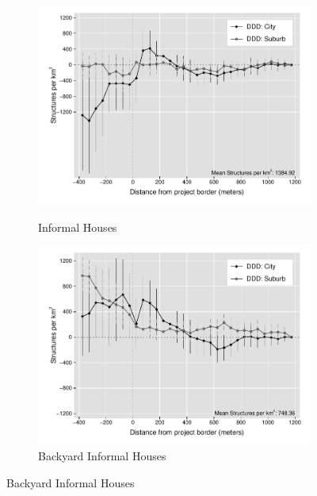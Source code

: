 \documentclass[12pt]{article}
\begin{document}
\begin{figure}[t!]
\begin{subfigure}[b]{0.49\textwidth}
        \label{fig:DDDformal_het}
    \end{subfigure}
    \vskip 1mm \vskip 0pt
    \begin{subfigure}[b]{0.49\textwidth}
        \centering
        \caption[]{\small Informal Houses}
        \vspace{-1mm}
        \includegraphics[width=\textwidth,trim={.5cm .3cm .3cm 0cm}, clip=true]{figures/distplotDDD_bblu_inf_admin_het_3}
        \label{fig:DDDinformal_het}
    \end{subfigure}
    \hfill
    \begin{subfigure}[b]{0.49\textwidth}  
        \centering
        \caption[]{\small Backyard Informal Houses}  
        \vspace{-1mm}
        \includegraphics[width=\textwidth,trim={.5cm .3cm .3cm 0cm}, clip=true]{figures/distplotDDD_bblu_inf_backyard_admin_het_3}

\end{subfigure}
\end{figure}
\end{document}
